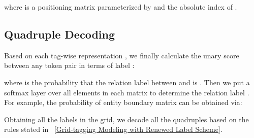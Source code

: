 \documentclass[11pt]{article}
\begin{document}
where 
 is a positioning matrix parameterized by  and the absolute index  of .

\vspace{-2pt}
\subsection{Quadruple Decoding}

Based on each tag-wise representation , we finally calculate the unary score between any token pair in terms of label :

where  is the probability that the relation label between  and  is .
Then we put a softmax layer over all elements in each matrix to determine the relation label .
For example, the probability of entity boundary matrix can be obtained via:


Obtaining all the labels in the grid, we decode all the quadruples based on the rules stated in ~\ref{Grid-tagging Modeling with Renewed Label Scheme}.
  
\end{document}
